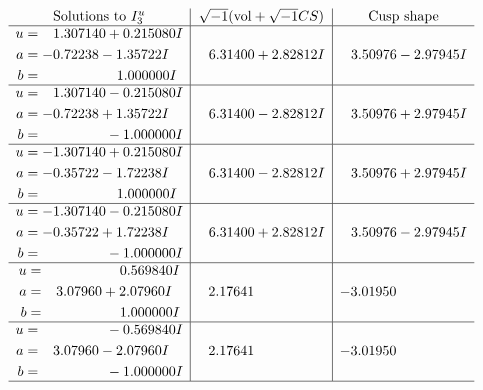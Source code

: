 \documentclass[1p]{elsarticle_modified}
\theoremstyle{definition}
\newcommand{\I}{\sqrt{-1}}
\begin{document}
$$\begin{array}{c|c|c}  
\text{Solutions to }I^u_{3}& \I (\text{vol} + \sqrt{-1}CS) & \text{Cusp shape}\\
 \hline 
\begin{aligned}
u &= \phantom{-}1.307140 + 0.215080 I \\
a &= -0.72238 - 1.35722 I \\
b &= \phantom{-0.000000 -}1.000000 I\end{aligned}
 & \phantom{-}6.31400 + 2.82812 I & \phantom{-}3.50976 - 2.97945 I \\ \hline\begin{aligned}
u &= \phantom{-}1.307140 - 0.215080 I \\
a &= -0.72238 + 1.35722 I \\
b &= \phantom{-0.000000 } -1.000000 I\end{aligned}
 & \phantom{-}6.31400 - 2.82812 I & \phantom{-}3.50976 + 2.97945 I \\ \hline\begin{aligned}
u &= -1.307140 + 0.215080 I \\
a &= -0.35722 - 1.72238 I \\
b &= \phantom{-0.000000 -}1.000000 I\end{aligned}
 & \phantom{-}6.31400 - 2.82812 I & \phantom{-}3.50976 + 2.97945 I \\ \hline\begin{aligned}
u &= -1.307140 - 0.215080 I \\
a &= -0.35722 + 1.72238 I \\
b &= \phantom{-0.000000 } -1.000000 I\end{aligned}
 & \phantom{-}6.31400 + 2.82812 I & \phantom{-}3.50976 - 2.97945 I \\ \hline\begin{aligned}
u &= \phantom{-0.000000 -}0.569840 I \\
a &= \phantom{-}3.07960 + 2.07960 I \\
b &= \phantom{-0.000000 -}1.000000 I\end{aligned}
 & \phantom{-}2.17641\phantom{ +0.000000I} & -3.01950\phantom{ +0.000000I} \\ \hline\begin{aligned}
u &= \phantom{-0.000000 } -0.569840 I \\
a &= \phantom{-}3.07960 - 2.07960 I \\
b &= \phantom{-0.000000 } -1.000000 I\end{aligned}
 & \phantom{-}2.17641\phantom{ +0.000000I} & -3.01950\phantom{ +0.000000I}\\
 \hline 
 \end{array}$$\newpage\newpage\renewcommand{\arraystretch}{1}
\end{document}
